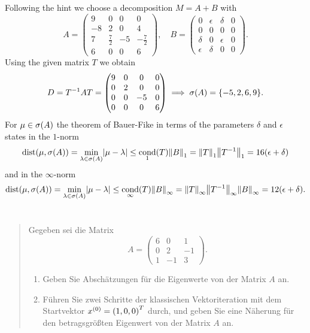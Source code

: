 \documentclass{exercise}
\begin{document}
	Following the hint we choose a decomposition \(M = A + B\) with
	\[
		A = \begin{pmatrix}
			9 & 0 & 0 & 0\\
			-8 & 2 & 0 & 4\\
			7 & \frac{7}{2} & -5 & -\frac{7}{2}\\
			6 & 0 & 0 & 6
		\end{pmatrix}, \quad B = \begin{pmatrix}
			0 & \epsilon & \delta & 0\\
			0 & 0 & 0 & 0\\
			\delta & 0 & \epsilon & 0\\
			\epsilon & \delta & 0 & 0
		\end{pmatrix}.
	\]
	Using the given matrix \(T\) we obtain
	\[
		D = T^{-1}AT = \begin{pmatrix}
			9 & 0 & 0 & 0\\
			0 & 2 & 0 & 0\\
			0 & 0 & -5 & 0\\
			0 & 0 & 0 & 6
		\end{pmatrix} \implies \sigma\parentheses*{A} = \braces*{-5, 2, 6, 9}.
	\]
	For \(\mu \in \sigma\parentheses*{A}\) the theorem of Bauer-Fike in terms of the parameters \(\delta\) and \(\epsilon\) states in the \(1\)-norm
	\[
		\dist\parentheses*{\mu, \sigma\parentheses*{A}} = \min_{\lambda \in \sigma\parentheses*{A}}\absolute*{\mu - \lambda} \le \cond_1\parentheses*{T}\norm*{B}_1 = \norm*{T}_1 \norm*{T^{-1}}_1 = 16\parentheses*{\epsilon + \delta}
	\]
	and in the \(\infty\)-norm
	\[
		\dist\parentheses*{\mu, \sigma\parentheses*{A}} = \min_{\lambda \in \sigma\parentheses*{A}}\absolute*{\mu - \lambda} \le \cond_\infty\parentheses*{T}\norm*{B}_\infty = \norm*{T}_\infty \norm*{T^{-1}}_\infty \norm*{B}_\infty = 12\parentheses*{\epsilon + \delta}.
	\]


	\section{}

	\begin{quote}
		Gegeben sei die Matrix
		\[
			A = \begin{pmatrix}
				6 & 0 & 1\\
				0 & 2 & -1\\
				1 & -1 & 3
			\end{pmatrix}.
		\]
		\begin{enumerate}
			\item Geben Sie Abschätzungen für die Eigenwerte von der Matrix \(A\) an.
			\item Führen Sie zwei Schritte der klassischen Vektoriteration mit dem Startvektor \(x^{\parentheses*{0}} = \parentheses*{1, 0, 0}^T\) durch, und geben Sie eine Näherung für den betragsgrößten Eigenwert von der Matrix \(A\) an.
		\end{enumerate}
	\end{quote}
\end{document}

